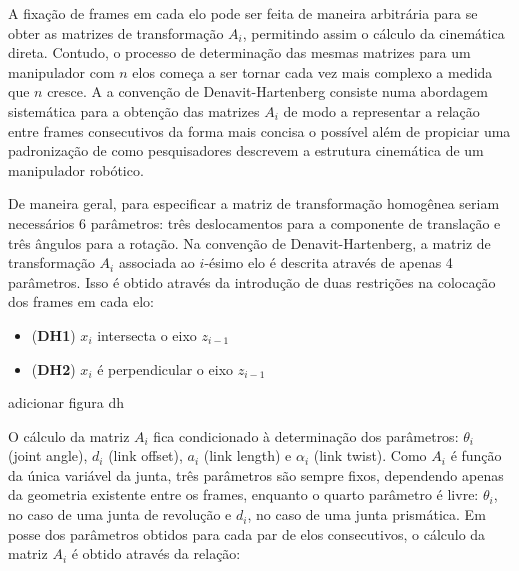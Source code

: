 A fixação de frames em cada elo pode ser feita de maneira arbitrária para se
obter as matrizes de transformação $A_i$, permitindo assim o cálculo da
cinemática direta. Contudo, o processo de determinação das mesmas matrizes para
um manipulador com $n$ elos começa a ser tornar cada vez mais complexo a medida
que $n$ cresce. A a convenção de Denavit-Hartenberg consiste numa abordagem
sistemática para a obtenção das matrizes $A_i$ de modo a representar a relação
entre frames consecutivos da forma mais concisa o possível além de propiciar
uma padronização de como pesquisadores descrevem a estrutura cinemática de um
manipulador robótico.

De maneira geral, para especificar a matriz de transformação homogênea seriam
necessários 6 parâmetros: três deslocamentos para a componente de translação e
três ângulos para a rotação. Na convenção de Denavit-Hartenberg, a matriz de
transformação $A_i$ associada ao $i$-ésimo elo é descrita através de apenas 4
parâmetros. Isso é obtido através da introdução de duas restrições na colocação
dos frames em cada elo:

\begin{itemize}
    \item (\textbf{DH1}) $x_i$ intersecta o eixo $z_{i-1}$
    \item (\textbf{DH2}) $x_i$ é perpendicular o eixo $z_{i-1}$
\end{itemize}

adicionar figura dh

O cálculo da matriz $A_i$ fica condicionado à determinação dos parâmetros:
$\theta_i$ (joint angle), $d_i$ (link offset), $a_i$ (link length) e $\alpha_i$
(link twist). Como $A_i$ é função da única variável da junta, três parâmetros
são sempre fixos, dependendo apenas da geometria existente entre os frames,
enquanto o quarto parâmetro é livre: $\theta_i$, no caso de uma junta de
revolução e $d_i$, no caso de uma junta prismática. Em posse dos parâmetros
obtidos para cada par de elos consecutivos, o cálculo da matriz $A_i$ é obtido
através da relação:

